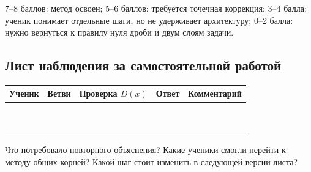 \begin{teacherbox}[Интерпретация]
  7--8 баллов: метод освоен; 5--6 баллов: требуется точечная коррекция;
  3--4 балла: ученик понимает отдельные шаги, но не удерживает архитектуру;
  0--2 балла: нужно вернуться к правилу нуля дроби и двум слоям задачи.
\end{teacherbox}

\subsection{Лист наблюдения за самостоятельной работой}

\begin{center}
  \small
  \renewcommand{\arraystretch}{1.55}
  \begin{tabularx}{\textwidth}{
    >{\raggedright\arraybackslash}p{}
    >{\centering\arraybackslash}p{}
    >{\centering\arraybackslash}p{}
    >{\centering\arraybackslash}p{}
    >{\raggedright\arraybackslash}X}
    \toprule
    \rowcolor{TableHeader}
    Ученик & Ветви & Проверка \(D(x)\) & Ответ & Комментарий \\
    \midrule
    \rule{0pt}{5mm} & & & & \\
    \midrule
    \rule{0pt}{5mm} & & & & \\
    \midrule
    \rule{0pt}{5mm} & & & & \\
    \midrule
    \rule{0pt}{5mm} & & & & \\
    \midrule
    \rule{0pt}{5mm} & & & & \\
    \midrule
    \rule{0pt}{5mm} & & & & \\
    \midrule
    \rule{0pt}{5mm} & & & & \\
    \midrule
    \rule{0pt}{5mm} & & & & \\
    \midrule
    \rule{0pt}{5mm} & & & & \\
    \midrule
    \rule{0pt}{5mm} & & & & \\
    \bottomrule
  \end{tabularx}
\end{center}

\begin{teacherbox}
  Что потребовало повторного объяснения? Какие ученики смогли перейти к
  методу общих корней? Какой шаг стоит изменить в следующей версии листа?
\end{teacherbox}
\workarea{28mm}
